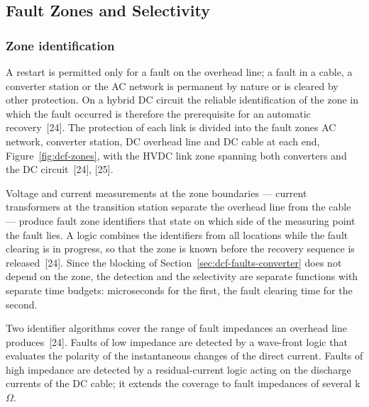 \subsection{Fault Zones and Selectivity}
\label{sec:dcf-zones}

\subsubsection{Zone identification}
\label{sec:dcf-zones-identification}

A restart is permitted only for a fault on the overhead line; a fault in a
cable, a converter station or the AC network is permanent by nature or is
cleared by other protection. On a hybrid DC circuit the reliable
identification of the zone in which the fault occurred is therefore the
prerequisite for an automatic recovery~[24]. The protection of each link is
divided into the fault zones AC network, converter station, DC overhead
line and DC cable at each end, Figure~\ref{fig:dcf-zones}, with the HVDC
link zone spanning both converters and the DC circuit~[24], [25].

Voltage and current measurements at the zone boundaries --- current
transformers at the transition station separate the overhead line from the
cable --- produce fault zone identifiers that state on which side of the
measuring point the fault lies. A logic combines the identifiers from all
locations while the fault clearing is in progress, so that the zone is known
before the recovery sequence is released~[24]. Since the blocking of
Section~\ref{sec:dcf-faults-converter} does not depend on the zone, the
detection and the selectivity are separate functions with separate time
budgets: microseconds for the first, the fault clearing time for the
second.

Two identifier algorithms cover the range of fault impedances an overhead
line produces~[24]. Faults of low impedance are detected by a wave-front
logic that evaluates the polarity of the instantaneous changes of the direct
current. Faults of high impedance are detected by a residual-current logic
acting on the discharge currents of the DC cable; it extends the coverage to
fault impedances of several k$\Omega$.

